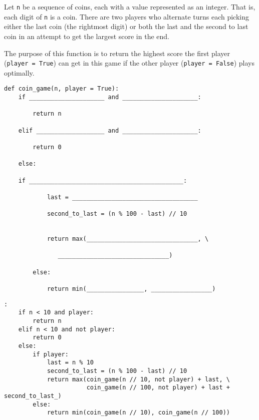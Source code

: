 \begin{blocksection}
\question Let \texttt{n} be a sequence of coins, each with a value represented as an integer. That is, each digit of \texttt{n} is a coin. There are two players who alternate turns each picking either the last coin (the rightmost digit) or both the last and the second to last coin in an attempt to get the largest score in the end. 

The purpose of this function is to return the highest score the first player (\texttt{player = True}) can get in this game if the other player (\texttt{player = False}) plays optimally. \\

\begin{lstlisting}
def coin_game(n, player = True):
    if _____________________ and _____________________:

        return n			

    elif ___________________ and _____________________:		

        return 0			

    else:

	if ___________________________________________:			

            last = ___________________________________			

            second_to_last = (n % 100 - last) // 10


            return max(_______________________________, \

		       _______________________________)

        else:	

            return min(________________, _________________)

\end{lstlisting}

\begin{solution}[1in]
\begin{lstlisting}:
    if n < 10 and player:
        return n
    elif n < 10 and not player:
        return 0
    else:
        if player:
            last = n % 10
            second_to_last = (n % 100 - last) // 10
            return max(coin_game(n // 10, not player) + last, \
                       coin_game(n // 100, not player) + last + second_to_last_)
        else:
            return min(coin_game(n // 10), coin_game(n // 100))

\end{lstlisting}
\end{solution}
\end{blocksection}
